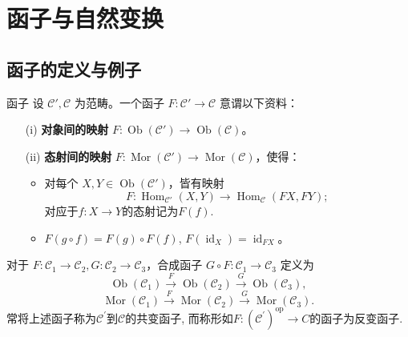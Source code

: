 \documentclass{beamer}
\newcommand\cat{\mathcal{C}}
\begin{document}
	\section{函子与自然变换}
	
	\subsection{函子的定义与例子}
	
	\begin{frame}{函子}
		设 $\mathcal{C}', \mathcal{C}$ 为范畴。一个函子 $F: \mathcal{C}' \to \mathcal{C}$ 意谓以下资料：
		\begin{itemize}
			\item[(i)] \textbf{对象间的映射} $F: \operatorname{Ob}(\mathcal{C}') \to \operatorname{Ob}(\mathcal{C})$。
			\item[(ii)] \textbf{态射间的映射} $F: \operatorname{Mor}(\mathcal{C}') \to \operatorname{Mor}(\mathcal{C})$，使得：
			\begin{itemize}
				\item 对每个 $X, Y \in \operatorname{Ob}(\mathcal{C}')$，皆有映射
				\[
				F: \operatorname{Hom}_{\mathcal{C}'}(X, Y) \to \operatorname{Hom}_{\mathcal{C}}(FX, FY);
				\]对应于$f : X \rightarrow Y$的态射记为$F(f)$.
				\item $F(g \circ f) = F(g) \circ F(f)$, $F(\operatorname{id}_X) = \operatorname{id}_{FX}$。
			\end{itemize}
		\end{itemize}
		
		对于 $F: \mathcal{C}_1 \to \mathcal{C}_2,G: \mathcal{C}_2 \to \mathcal{C}_3$，合成函子 $G \circ F: \mathcal{C}_1 \to \mathcal{C}_3$ 定义为
		\[
		\operatorname{Ob}(\mathcal{C}_1) \xrightarrow{F} \operatorname{Ob}(\mathcal{C}_2) \xrightarrow{G} \operatorname{Ob}(\mathcal{C}_3),
		\]
		\[
		\operatorname{Mor}(\mathcal{C}_1) \xrightarrow{F} \operatorname{Mor}(\mathcal{C}_2) \xrightarrow{G} \operatorname{Mor}(\mathcal{C}_3).
		\]
		常将上述函子称为$\cat^{\prime}$到$\cat$的共变函子, 而称形如$ F:(\cat^{\prime})^{\mathrm{op}}\rightarrow C$的函子为反变函子.
	\end{frame}
	
\end{document}
